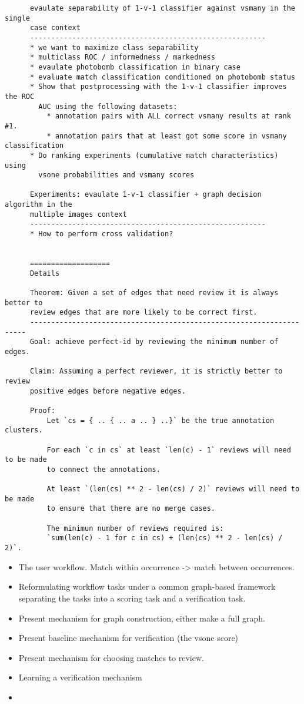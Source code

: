 \begin{verbatim}
      evaulate separability of 1-v-1 classifier against vsmany in the single
      case context
      --------------------------------------------------------
      * we want to maximize class separability 
      * multiclass ROC / informedness / markedness
      * evaulate photobomb classification in binary case
      * evaluate match classification conditioned on photobomb status
      * Show that postprocessing with the 1-v-1 classifier improves the ROC
        AUC using the following datasets:
          * annotation pairs with ALL correct vsmany results at rank #1.
          * annotation pairs that at least got some score in vsmany classification
      * Do ranking experiments (cumulative match characteristics) using
        vsone probabilities and vsmany scores

      Experiments: evaulate 1-v-1 classifier + graph decision algorithm in the
      multiple images context
      --------------------------------------------------------
      * How to perform cross validation?


      ===================
      Details

      Theorem: Given a set of edges that need review it is always better to
      review edges that are more likely to be correct first.
      ---------------------------------------------------------------------
      Goal: achieve perfect-id by reviewing the minimum number of edges.

      Claim: Assuming a perfect reviewer, it is strictly better to review
      positive edges before negative edges.

      Proof:
          Let `cs = { .. { .. a .. } ..}` be the true annotation clusters.

          For each `c in cs` at least `len(c) - 1` reviews will need to be made
          to connect the annotations.

          At least `(len(cs) ** 2 - len(cs) / 2)` reviews will need to be made
          to ensure that there are no merge cases. 

          The minimun number of reviews required is: 
          `sum(len(c) - 1 for c in cs) + (len(cs) ** 2 - len(cs) / 2)`. 
  \end{verbatim}

    \begin{itemize}
        \item The user workflow. Match within occurrence -> match between occurrences.
        \item Reformulating workflow tasks under a common graph-based framework
            separating the tasks into a scoring task and a verification task.
        \item Present mechanism for graph construction, either make a full graph.
        \item Present baseline mechanism for verification (the vsone score)
        \item Present mechanism for choosing matches to review. 
        \item Learning a verification mechanism
        \item 
    \end{itemize}
    
